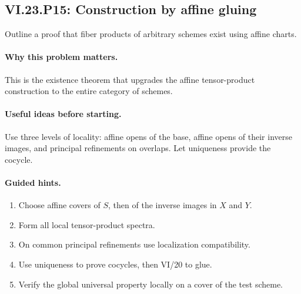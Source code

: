\subsection*{VI.23.P15: Construction by affine gluing}
\begin{problem}\label{prob:vi23-p15}
Outline a proof that fiber products of arbitrary schemes exist using affine charts.
\end{problem}

\ifdefined\FullProblemDossiers
\paragraph{Why this problem matters.}
This is the existence theorem that upgrades the affine tensor-product construction to the entire category of schemes.

\paragraph{Useful ideas before starting.}
Use three levels of locality: affine opens of the base, affine opens of their inverse images, and principal refinements on overlaps.  Let uniqueness provide the cocycle.

\paragraph{Guided hints.}
\begin{enumerate}
\item Choose affine covers of $S$, then of the inverse images in $X$ and $Y$.
\item Form all local tensor-product spectra.
\item On common principal refinements use localization compatibility.
\item Use uniqueness to prove cocycles, then VI/20 to glue.
\item Verify the global universal property locally on a cover of the test scheme.
\end{enumerate}

